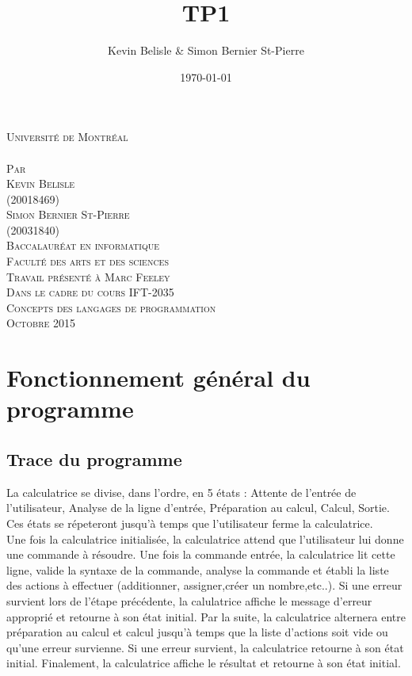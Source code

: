 \documentclass[a4paper,12pt,french]{article}
\date{\today}
\author{Kevin Belisle \& Simon Bernier St-Pierre}
\title{TP1}
\newcommand{\Teacher}{Marc Feeley}
\newcommand{\ClassNum}{IFT-2035}
\newcommand{\ClassName}{Concepts des langages de programmation}
\newcommand{\DateMMMMYYYY}{Octobre 2015}
\newcommand{\Author}{Kevin Belisle}
\newcommand{\Authorr}{Simon Bernier St-Pierre}
\begin{document}
\begin{titlepage}
	\begin{center}
		\textsc{\normalsize Université de Montréal}\\[2.5cm]

		\textsc{\LARGE \@title}\\[2.5cm]

		\textsc{\small Par}\\[0.25cm]
		\textsc{\LARGE \Author}\\[0.25cm]
		\textsc{\normalsize (20018469)}\\[0.25cm]
		\textsc{\LARGE \Authorr}\\[0.25cm]
		\textsc{\normalsize (20031840)}\\[2.5cm]

		\textsc{\normalsize Baccalauréat en informatique}\\
		\textsc{\normalsize Faculté des arts et des sciences}\\[2.5cm]

		\textsc{\small Travail présenté à \Teacher}\\
		\textsc{\small Dans le cadre du cours \ClassNum}\\
		\textsc{\small \ClassName}\\[2.5cm]

		\textsc{\normalsize \DateMMMMYYYY}\\[1.5cm]
	\end{center}
\end{titlepage}
\section{Fonctionnement général du programme}
	\subsection{Trace du programme}
	La calculatrice se divise, dans l'ordre, en 5 états : Attente de l'entrée de l'utilisateur, Analyse de la ligne d'entrée, Préparation au calcul, Calcul, Sortie. Ces états se répeteront jusqu'à temps que l'utilisateur ferme la calculatrice.\\
	
	Une fois la calculatrice initialisée, la calculatrice attend que l'utilisateur lui donne une commande à résoudre. Une fois la commande entrée, la calculatrice lit cette ligne, valide la syntaxe de la commande, analyse la commande et établi la liste des actions à effectuer (additionner, assigner,créer un nombre,etc..). Si une erreur survient lors de l'étape précédente, la calulatrice affiche le message d'erreur approprié et retourne à son état initial. Par la suite, la calculatrice alternera entre préparation au calcul et calcul jusqu'à temps que la liste d'actions soit vide ou qu'une erreur survienne. Si une erreur survient, la calculatrice retourne à son état initial. Finalement, la calculatrice affiche le résultat et retourne à son état initial.
\end{document}
